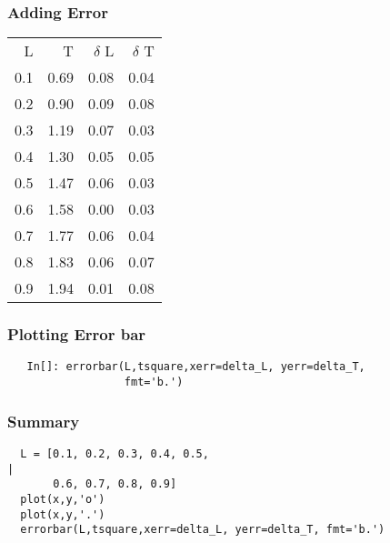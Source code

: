 \documentclass[presentation]{beamer}
\begin{document}
\begin{frame}
\frametitle{Adding Error}
\label{sec-4}




\begin{center}
\begin{tabular}{rrrr}
   L  &     T  &  $\delta$ L  &  $\delta$ T  \\
 0.1  &  0.69  &        0.08  &        0.04  \\
 0.2  &  0.90  &        0.09  &        0.08  \\
 0.3  &  1.19  &        0.07  &        0.03  \\
 0.4  &  1.30  &        0.05  &        0.05  \\
 0.5  &  1.47  &        0.06  &        0.03  \\
 0.6  &  1.58  &        0.00  &        0.03  \\
 0.7  &  1.77  &        0.06  &        0.04  \\
 0.8  &  1.83  &        0.06  &        0.07  \\
 0.9  &  1.94  &        0.01  &        0.08  \\
\end{tabular}
\end{center}


 
 
\end{frame}
\begin{frame}[fragile]
\frametitle{Plotting Error bar}
\label{sec-5}

  
\begin{verbatim}
   In[]: errorbar(L,tsquare,xerr=delta_L, yerr=delta_T,
                  fmt='b.')
\end{verbatim}
\end{frame}
\begin{frame}[fragile]
\frametitle{Summary}
\label{sec-6}

\begin{verbatim}
  L = [0.1, 0.2, 0.3, 0.4, 0.5,                                             |
       0.6, 0.7, 0.8, 0.9]  
  plot(x,y,'o')
  plot(x,y,'.')
  errorbar(L,tsquare,xerr=delta_L, yerr=delta_T, fmt='b.')    
\end{verbatim}
\end{frame}
\end{document}
